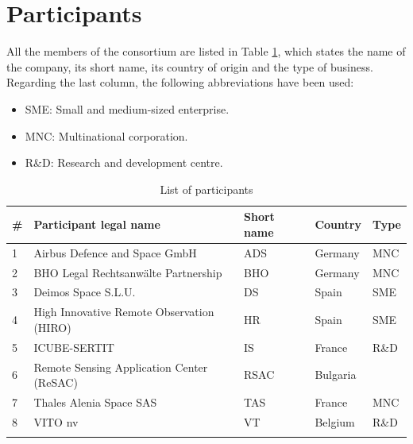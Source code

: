 \section{Participants}
All the members of the consortium are listed in Table \ref{participants}, which states the name of the company, its short name, its country of origin and the type of business. Regarding the last column, the following abbreviations have been used:
\begin{itemize}
	\item SME: Small and medium-sized enterprise.
	\item MNC: Multinational corporation.
	\item R\&D: Research and development centre.
\end{itemize} 
\begin{longtable}[H]{p{1cm} p{5.7cm} p{2cm} p{2cm} p{2cm}}
	\toprule[2pt]
	
	\textbf{\#} & \textbf{Participant legal name} & \textbf{Short name} & \textbf{Country} & \textbf{Type} \\
	
	\midrule[1.5pt] 
	\endhead
	
	1 & Airbus Defence and Space GmbH & ADS & Germany & MNC \vspace{0.2cm} \\	\midrule
	
	2 & BHO Legal Rechtsanwälte Partnership & BHO & Germany & MNC \vspace{0.2cm} \\	\midrule
	
	3 & Deimos Space S.L.U. & DS & Spain & SME \vspace{0.2cm} \\ \midrule
	
	4 & High Innovative Remote Observation (HIRO) & HR & Spain & SME \vspace{0.2cm} \\ \midrule
	
	5 & ICUBE-SERTIT & IS & France & R\&D \vspace{0.2cm} \\ \midrule
	
	6 & Remote Sensing Application Center (ReSAC) & RSAC & Bulgaria &  \vspace{0.2cm} \\ \midrule
	
	7 & Thales Alenia Space SAS & TAS & France & MNC \vspace{0.2cm} \\ \midrule
	
	8 & VITO nv & VT & Belgium & R\&D \vspace{0.2cm} \\ \bottomrule[2pt]
	
	\caption{List of participants}
	\label{participants}
\end{longtable}

